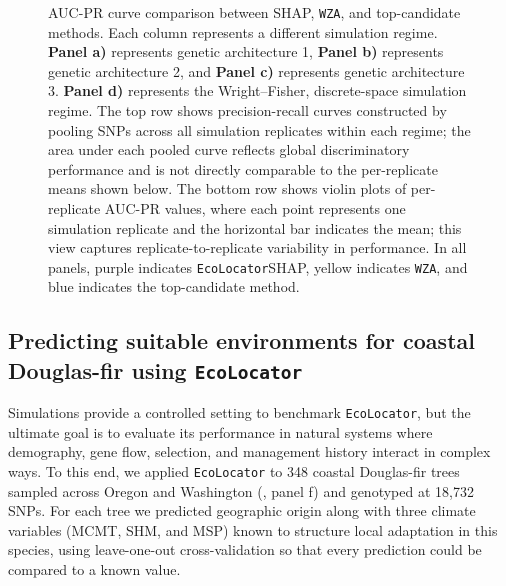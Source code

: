 \documentclass[]{article}
\newcommand{\dfir}{Douglas-fir\xspace}
\newcommand{\ecolocator}{\texttt{EcoLocator}\xspace}
\begin{document}
\begin{figure}[H]
    \caption{AUC-PR curve comparison between SHAP, \texttt{WZA}, and top-candidate methods.
    Each column represents a different simulation regime. \textbf{Panel a)} represents
    genetic architecture 1, \textbf{Panel b)} represents genetic architecture 2,
    and \textbf{Panel c)} represents genetic architecture 3. \textbf{Panel d)}
    represents the Wright--Fisher, discrete-space simulation regime. The top row
    shows precision-recall curves constructed by pooling SNPs across all simulation
    replicates within each regime; the area under each pooled curve reflects
    global discriminatory performance and is not directly comparable to the
    per-replicate means shown below. The bottom row shows violin plots of
    per-replicate AUC-PR values, where each point represents one simulation
    replicate and the horizontal bar indicates the mean; this view captures
    replicate-to-replicate variability in performance. In all panels,
    purple indicates \ecolocator\texttimes{}SHAP, yellow indicates \texttt{WZA},
    and blue indicates the top-candidate method.}
    \label{fig:gea-comparison}
\end{figure}


\subsection{Predicting suitable environments
for coastal \dfir using \ecolocator}

Simulations provide a controlled setting to benchmark \ecolocator,
but the ultimate goal is to evaluate its performance in natural systems
where demography, gene flow, selection, and management history
interact in complex ways. To this end,
we applied \ecolocator to 348 coastal \dfir trees
sampled across Oregon and Washington (, panel f)
and genotyped at 18,732 SNPs.
For each tree we predicted geographic origin along with three climate
variables (MCMT, SHM, and MSP) known to structure local adaptation in this species,
using leave-one-out cross-validation so that every prediction
could be compared to a known value.
\end{document}
